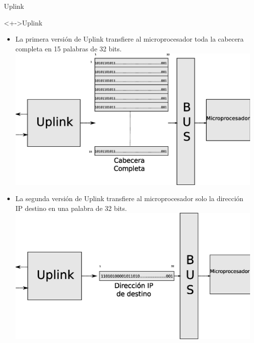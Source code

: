 \documentclass[xcolor=dvipsnames]{beamer}
\begin{document}
\begin{frame}{Uplink}
  \begin{block}<+->{Uplink}
	\begin{itemize}
      \scriptsize
	\item La primera versión de Uplink transfiere al microprocesador toda la cabecera completa en 15 palabras de 32 bits. 
	\center
	\includegraphics[scale=0.20]{figures/15pal.eps}  
	   \end{itemize}
	\begin{itemize}
      \scriptsize
	\item La segunda versión de Uplink transfiere al microprocesador solo la dirección IP destino en una palabra de 32 bits.
	\center
	\includegraphics[scale=0.20]{figures/1pal.eps}
   \end{itemize}
\end{block}
\end{frame}
\end{document}
